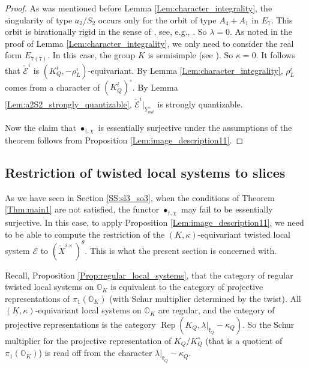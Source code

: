 \documentclass[12pt]{amsart}
\newcommand{\Orb}{\mathbb{O}}
\newcommand{\kf}{\mathfrak{k}}
\theoremstyle{definition}
\numberwithin{equation}{section}
\begin{document}
\begin{proof}
As was mentioned before Lemma \ref{Lem:character_integrality}, the singularity of type $a_2/S_2$ occurs only for the orbit of type $A_4+A_1$ in $E_7$. This orbit is birationally rigid in the sense of \cite[Definition 1.2]{orbit}, see, e.g., \cite[Proposition 3.1]{Fu}.
So $\lambda=0$.
As noted in the proof of Lemma  \ref{Lem:character_integrality}, we only need to consider the real form $E_{7(7)}$. In this case, the group $K$ is semisimple (see \cite[Table 3]{realgrp}).
So $\kappa=0$. It follows that $\check{\mathcal{E}}^i$
is $(K^i_Q,-\rho^i_{L})$-equivariant. By Lemma \ref{Lem:character_integrality},
$\rho^i_L$ comes from a character of $(K^i_Q)^\circ$. By Lemma \ref{Lem:a2S2_strongly_quantizable},
$\check{\mathcal{E}}^i|_{Y_{out}^\times}$ is strongly quantizable. 

Now the claim that $\bullet_{\dagger,\chi}$ is essentially surjective under the assumptions of the theorem
follows from Proposition \ref{Lem:image_description11}.
\end{proof}





\subsection{Restriction of twisted local systems to slices}\label{SS_loc_sys_slice_restriction}
As we have seen in Section \ref{SS:sl3_so3}, when the conditions of Theorem \ref{Thm:main1} are not satisfied, the functor $\bullet_{\dagger,\chi}$ may fail to be essentially surjective. In this case,
to apply Proposition \ref{Lem:image_description11}, we need to be able to compute the restriction
of the $(K,\kappa)$-equivariant twisted local system $\mathcal{E}$ to $(\check{X}^{i\times})^\theta$.
This is what the present section is concerned with.

Recall, Proposition \ref{Prop:regular_local_systems},
that the category of regular twisted local systems on $\Orb_K$
is equivalent to the category of projective representations of $\pi_1(\Orb_K)$ (with Schur multiplier
determined by the twist). All $(K,\kappa)$-equivariant local systems on $\Orb_K$ are regular, and the category of projective representations is the category $\operatorname{Rep}(K_Q,\lambda|_{\kf_Q}-\kappa_Q)$.
So the Schur multiplier for the projective representation of $K_Q/K_Q^\circ$ (that is a quotient
of $\pi_1(\Orb_K)$) is read off from the character $\lambda|_{\kf_Q}-\kappa_Q$.
\end{document}
